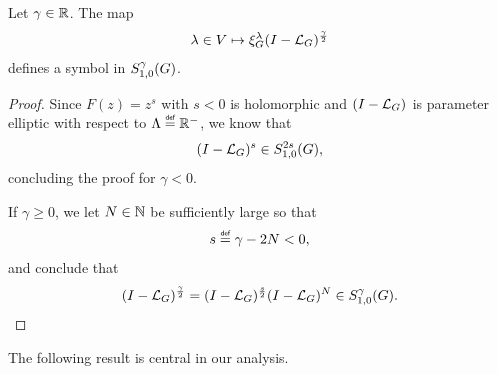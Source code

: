 \begin{corollary}
\label{corollary:powers_of_the_Laplacian}
    Let $\gamma \in \mathbb{R}$.
    The map
    \begin{align*}
        \lambda \in V \mapsto \xi^{\lambda}_{G} (I - {\mathcal{L}_{G}})^\frac{\gamma}{2}
    \end{align*}
    defines a symbol in $S^{\gamma}_{1, 0}(G)$.
\end{corollary}
\begin{proof}
    Since $F(z) = z^s$ with $s < 0$ is holomorphic
    and $(I - {\mathcal{L}_{G}})^{}$ is parameter elliptic with respect to $\Lambda \defeq \R^-$,
    we know that
    \begin{align*}
        (I - {\mathcal{L}_{G}})^{s} \in S^{2 s}_{1, 0}(G),
    \end{align*}
    concluding the proof for $\gamma < 0$.

    If $\gamma \geq 0$,
    we let $N \in \mathbb{N}$ be sufficiently large so that
    \begin{align*}
        s \defeq \gamma - 2N < 0,
    \end{align*}
    and conclude that
    \begin{align*}
        (I - {\mathcal{L}_{G}})^\frac{\gamma}{2} = (I - {\mathcal{L}_{G}})^\frac{s}{2} (I - {\mathcal{L}_{G}})^{N} \in S^{\gamma}_{1, 0}(G).
    \end{align*}
\end{proof}

The following result is central in our analysis.

